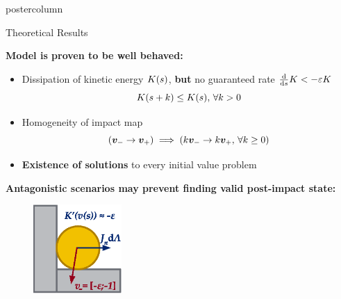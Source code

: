 \documentclass[final,hyperref={pdfpagelabels=false},5pt]{beamer}
\newlength{\columnheight}
\begin{document}
\begin{frame}
\begin{columns}
\hfill

    \begin{column}{.49\textwidth}
      \begin{beamercolorbox}[center,wd=\textwidth]{postercolumn}
        \begin{minipage}[T]{.95\textwidth} %
          \parbox[t][\columnheight]{\textwidth}{ %
             \begin{block}{Theoretical Results}
             \begin{center}
             	\textbf{Model is proven to be well behaved:}
             \end{center}
              \begin{itemize}
              \item Dissipation of kinetic energy $K(s)$, \textbf{but} no guaranteed rate $\frac{{\mathrm{d}} }{{\mathrm{d}}s}K < - \varepsilon K$
               $$K (s + k) \leq K (s),\, \forall k > 0$$
              \item Homogeneity of impact map
              	$$\left( \bm{v}_- \to \bm{v}_+ \right) \implies \left( k\bm{v}_- \to k\bm{v}_+,\, \forall k \geq 0 \right)$$
              \item \textbf{Existence of solutions} to every initial value problem
              \end{itemize}
              \vspace{1ex}
              \begin{center}
               \textbf{\color{pennrd} Antagonistic scenarios may prevent finding valid post-impact state:}
               \end{center}
              \begin{figure}
              	\includegraphics[width=0.3\textwidth]{Corner}

\end{figure}
\end{block}}
\end{minipage}
\end{beamercolorbox}
\end{column}
\end{columns}
\end{frame}
\end{document}
